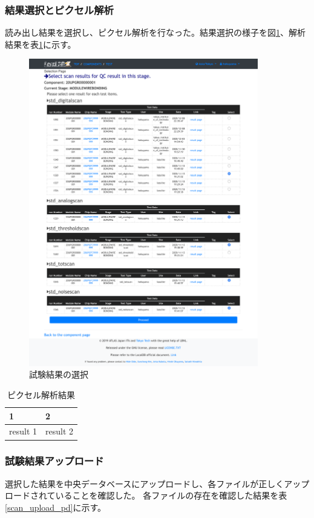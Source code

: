 \newpage
\subsubsection{結果選択とピクセル解析}
読み出し結果を選択し、ピクセル解析を行なった。結果選択の様子を図\ref{demo_select_scans}、解析結果を表\ref{pixel_analysis_result}に示す。

\begin{figure}[bpt]\centering
  \begin{center}
    \includegraphics[width=10cm]{demo_select_scans}
  \caption[試験結果の選択]{試験結果の選択}
  \label{demo_select_scans}
  \end{center}
\end{figure}

\begin{table}[tbp]
\begin{center}
\caption[ピクセル解析結果]{ピクセル解析結果}
\label{pixel_analysis_result}
  \begin{tabular}{|ll|} \hline
    1 & 2 \\ \hline
    result 1 & result 2 \\ \hline 
  \end{tabular}
\end{center}
\end{table}


\newpage
\subsubsection{試験結果アップロード}
選択した結果を中央データベースにアップロードし、各ファイルが正しくアップロードされていることを確認した。
各ファイルの存在を確認した結果を表\ref{scan_upload_pd}に示す。

